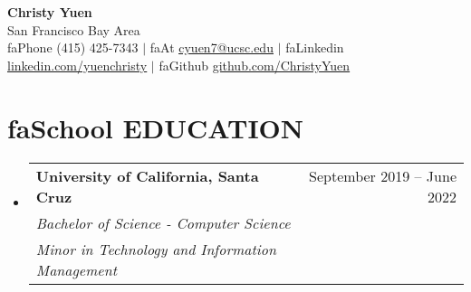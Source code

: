 \documentclass[a4paper,11pt]{article}
\makeatletter
\newcommand{\seticon}[1]{\textcolor{Cerulean}{\csname #1\endcsname}}
\newcommand{\resumeSubheading}[4]{
  \vspace{-2pt}\item
    \begin{tabular*}{0.97\textwidth}[t]{l@{\extracolsep{\fill}}r}
      \textbf{#1} & #2 \\
      \textit{\small#3} & \textnormal{\small #4} \\
    \end{tabular*}\vspace{-8pt}
}
\newcommand{\resumeSub}[6]{ %
  \vspace{-2pt}\item
    \begin{tabular*}{0.97\textwidth}[t]{l@{\extracolsep{\fill}}r}
      \textbf{#1} & #2 \\
      \textit{\small#3} & \textnormal{\small #4} \\
      \textit{\small#5} & \textnormal{\small #6} \\
    \end{tabular*} \vspace{-8pt}
}
\newcommand{\resumeSubHeadingListStart}{\begin{itemize}[leftmargin=0.15in, label={}]}
\newcommand{\resumeSubHeadingListEnd}{\end{itemize}}
\makeatother
\begin{document}
\iffalse
\begin{wrapfigure}{R}{0.15\textwidth}
\vspace{-25pt}
\texttt{[image: dp\_cropped]}
\end{wrapfigure}
\fi

\begin{center}
    \textbf{\Huge Christy Yuen} \\
    \normalfont San Francisco Bay Area \vspace{1pt} \\
    \small \seticon{faPhone} (415) 425-7343 $|$ 
    \seticon{faAt} \href{mailto:x@x.com}{\ul{cyuen7@ucsc.edu}} $|$ 
    \seticon{faLinkedin} 
    		\href{https://www.linkedin.com/in/yuenchristy/}{\ul{linkedin.com/yuenchristy}} $|$ 
    \seticon{faGithub} 
    		\href{https://github.com/ChristyYuen}{\ul{github.com/ChristyYuen}}
\end{center}
\vspace{-12pt} %
\section{\seticon{faSchool} \textbf{EDUCATION}}
  \resumeSubHeadingListStart
    \resumeSub
      {University of California, Santa Cruz}{September 2019 -- June 2022}
      {Bachelor of Science - Computer Science}{}
      {Minor in Technology and Information Management}{}   
  \resumeSubHeadingListEnd
\end{document}
